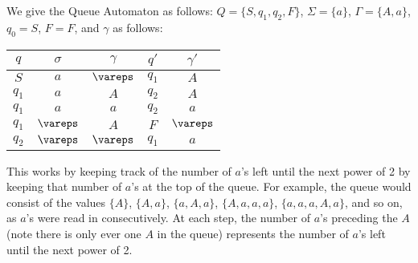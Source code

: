 \documentclass[solution, letterpaper]{cs121}
\begin{document}
\begin{solution}
We give the Queue Automaton as follows: $Q = \{S, q_1, q_2, F\}$, $\Sigma = \{a\}$, $\Gamma = \{A, a\}$, $q_0 = S$, $F = F$, and $\gamma$ as follows:
\begin{center}
\begin{table}[h!]
	\begin{center}
		\begin{tabular}{ c | c | c | c | c}
			$q$ & $\sigma$ & $\gamma$ & $q'$ & $\gamma'$\\
			\hline
			$S$ & $a$ & $\vareps$ & $q_1$ & $A$\\
			$q_1$ & $a$ & $A$ & $q_2$ & $A$\\
			$q_1$ & $a$ & $a$ & $q_2$ & $a$\\
			$q_1$ & $\vareps$ & $A$ & $F$ & $\vareps$\\
			$q_2$ & $\vareps$ & $\vareps$ & $q_1$ & $a$\\
		\end{tabular}
	\end{center}
\end{table}

\end{center}

This works by keeping track of the number of $a$'s left until the next power of 2 by keeping that number of $a$'s at the top of the queue.  For example, the queue would consist of the values $\{A\}$, $\{A, a\}$, $\{a, A, a\}$, $\{A, a, a, a\}$, $\{a, a, a, A, a\}$, and so on, as $a$'s were read in consecutively.  At each step, the number of $a$'s preceding the $A$ (note there is only ever one $A$ in the queue) represents the number of $a$'s left until the next power of 2.
\end{solution}
\end{document}
